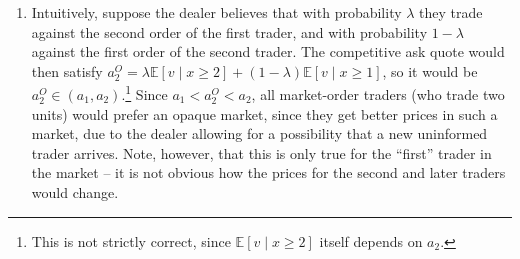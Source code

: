 \documentclass[a4paper]{article}
\begin{document}
\begin{enumerate}
	
	\item Intuitively, suppose the dealer believes that with probability $\lambda$ they trade against the second order of the first trader, and with probability $1-\lambda$ against the first order of the second trader. The competitive ask quote would then satisfy $a_2^O = \lambda \mathbb{E} [v \mid x \geq 2] + (1-\lambda) \mathbb{E} [v \mid x \geq 1]$, so it would be $a_2^O \in (a_1, a_2)$.\footnote{This is not strictly correct, since $\mathbb{E} [v \mid x \geq 2]$ itself depends on $a_2$.}
	Since $a_1 < a_2^O < a_2$, all market-order traders (who trade two units) would prefer an opaque market, since they get better prices in such a market, due to the dealer allowing for a possibility that a new uninformed trader arrives. Note, however, that this is only true for the ``first'' trader in the market -- it is not obvious how the prices for the second and later traders would change.
	
	

\end{enumerate}
\end{document}
